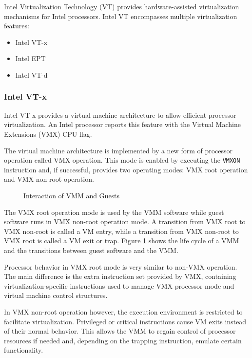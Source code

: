 Intel Virtualization Technology (VT) provides hardware-assisted
virtualization mechanisms for Intel processors. Intel VT encompasses multiple
virtualization features:
\begin{itemize}
	\item Intel VT-x
	\item Intel EPT
	\item Intel VT-d
\end{itemize}

\subsubsection{Intel VT-x}
Intel VT-x provides a virtual machine architecture to allow
efficient processor virtualization. An Intel processor reports this feature
with the Virtual Machine Extensions (VMX) CPU flag.

The virtual machine architecture is implemented by a new form of processor
operation called VMX operation. This mode is enabled by executing the
\texttt{VMXON} instruction and, if successful, provides two operating modes:
VMX root operation and VMX non-root operation.

\begin{figure}[h]
	\centering
	
	\caption{Interaction of VMM and Guests}
	\label{fig:vmm-lifecycle}
\end{figure}

The VMX root operation mode is used by the VMM software while guest software
runs in VMX non-root operation mode. A transition from VMX root to VMX non-root
is called a VM entry, while a transition from VMX non-root to VMX root is called
a VM exit or trap. Figure \ref{fig:vmm-lifecycle} shows the life cycle of a VMM
and the transitions between guest software and the VMM.

Processor behavior in VMX root mode is very similar to non-VMX operation.  The
main difference is the extra instruction set provided by VMX, containing
virtualization-specific instructions used to manage VMX processor mode and
virtual machine control structures.

In VMX non-root operation however, the execution environment is restricted to
facilitate virtualization. Privileged or critical instructions cause VM exits
instead of their normal behavior. This allows the VMM to regain control of
processor resources if needed and, depending on the trapping instruction,
emulate certain functionality.


